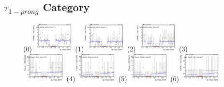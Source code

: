 \newpage

\subsection{$\tau_{1-prong}$ Category}
\label{sec:tauha}

\begin{figure}[h!]
        \centering
        \subfigure(0){\includegraphics[width=0.2\textwidth]{unfixed_exp/plots/tauhA/massfit_tauhA_40bins_bdtcut-0.2.png}}
        \subfigure(1){\includegraphics[width=0.2\textwidth]{unfixed_exp/plots/tauhA/massfit_tauhA_40bins_bdtcut-0.14.png}}
        \subfigure(2){\includegraphics[width=0.2\textwidth]{unfixed_exp/plots/tauhA/massfit_tauhA_40bins_bdtcut-0.08.png}}
        \subfigure(3){\includegraphics[width=0.2\textwidth]{unfixed_exp/plots/tauhA/massfit_tauhA_40bins_bdtcut-0.02.png}}
        \subfigure(4){\includegraphics[width=0.2\textwidth]{unfixed_exp/plots/tauhA/massfit_tauhA_40bins_bdtcut0.04.png}}
        \subfigure(5){\includegraphics[width=0.2\textwidth]{unfixed_exp/plots/tauhA/massfit_tauhA_40bins_bdtcut0.06.png}}
        \subfigure(6){\includegraphics[width=0.2\textwidth]{unfixed_exp/plots/tauhA/massfit_tauhA_40bins_bdtcut0.1.png}}

\end{figure}
